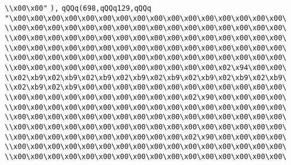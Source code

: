 \verb|\\x00\x00"|\newline
\verb|),|\newline
\verb|qQQq(698,qQQq129,qQQq|\newline
\verb|"\x00\x00\x00\x00\x00\x00\x00\x00\x00\x00\x00\x00\x00\x00\x00\x00\|\newline
\verb|\\x00\x00\x00\x00\x00\x00\x00\x00\x00\x00\x00\x00\x00\x00\x00\x00\|\newline
\verb|\\x00\x00\x00\x00\x00\x00\x00\x00\x00\x00\x00\x00\x00\x00\x00\x00\|\newline
\verb|\\x00\x00\x00\x00\x00\x00\x00\x00\x00\x00\x00\x00\x00\x00\x00\x00\|\newline
\verb|\\x00\x00\x00\x00\x00\x00\x00\x00\x00\x00\x00\x00\x00\x00\x00\x00\|\newline
\verb|\\x00\x00\x00\x00\x00\x00\x00\x00\x00\x00\x00\x00\x02\x94\x00\x00\|\newline
\verb|\\x02\xb9\x02\xb9\x02\xb9\x02\xb9\x02\xb9\x02\xb9\x02\xb9\x02\xb9\|\newline
\verb|\\x02\xb9\x02\xb9\x00\x00\x00\x00\x00\x00\x00\x00\x00\x00\x00\x00\|\newline
\verb|\\x00\x00\x00\x00\x00\x00\x00\x00\x00\x00\x02\x90\x00\x00\x00\x00\|\newline
\verb|\\x00\x00\x00\x00\x00\x00\x00\x00\x00\x00\x00\x00\x00\x00\x00\x00\|\newline
\verb|\\x00\x00\x00\x00\x00\x00\x00\x00\x00\x00\x00\x00\x00\x00\x00\x00\|\newline
\verb|\\x00\x00\x00\x00\x00\x00\x00\x00\x00\x00\x00\x00\x00\x00\x00\x00\|\newline
\verb|\\x00\x00\x00\x00\x00\x00\x00\x00\x00\x00\x02\x90\x00\x00\x00\x00\|\newline
\verb|\\x00\x00\x00\x00\x00\x00\x00\x00\x00\x00\x00\x00\x00\x00\x00\x00\|\newline
\verb|\\x00\x00\x00\x00\x00\x00\x00\x00\x00\x00\x00\x00\x00\x00\x00\x00\|\newline
